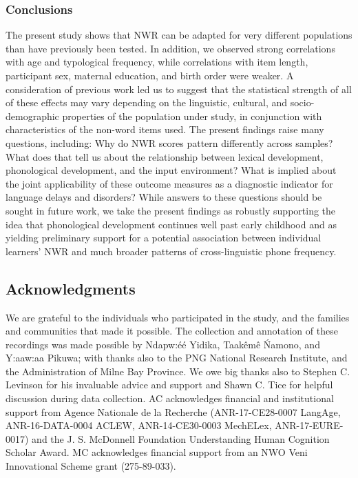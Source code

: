 \documentclass[
  american,
  ,man,floatsintext]{apa6}
\begin{document}
\hypertarget{conclusions}{%
\subsubsection{Conclusions}\label{conclusions}}

The present study shows that NWR can be adapted for very different populations than have previously been tested. In addition, we observed strong correlations with age and typological frequency, while correlations with item length, participant sex, maternal education, and birth order were weaker. A consideration of previous work led us to suggest that the statistical strength of all of these effects may vary depending on the linguistic, cultural, and socio-demographic properties of the population under study, in conjunction with characteristics of the non-word items used. The present findings raise many questions, including: Why do NWR scores pattern differently across samples? What does that tell us about the relationship between lexical development, phonological development, and the input environment? What is implied about the joint applicability of these outcome measures as a diagnostic indicator for language delays and disorders? While answers to these questions should be sought in future work, we take the present findings as robustly supporting the idea that phonological development continues well past early childhood and as yielding preliminary support for a potential association between individual learners' NWR and much broader patterns of cross-linguistic phone frequency.

\newpage

\hypertarget{acknowledgments}{%
\subsection{Acknowledgments}\label{acknowledgments}}

We are grateful to the individuals who participated in the study, and the families and communities that made it possible. The collection and annotation of these recordings was made possible by Ndapw:éé Yidika, Taakêmê Ńamono, and Y:aaw:aa Pikuwa; with thanks also to the PNG National Research Institute, and the Administration of Milne Bay Province. We owe big thanks also to Stephen C. Levinson for his invaluable advice and support and Shawn C. Tice for helpful discussion during data collection. AC acknowledges financial and institutional support from Agence Nationale de la Recherche (ANR-17-CE28-0007 LangAge, ANR-16-DATA-0004 ACLEW, ANR-14-CE30-0003 MechELex, ANR-17-EURE-0017) and the J. S. McDonnell Foundation Understanding Human Cognition Scholar Award. MC acknowledges financial support from an NWO Veni Innovational Scheme grant (275-89-033).
\end{document}
